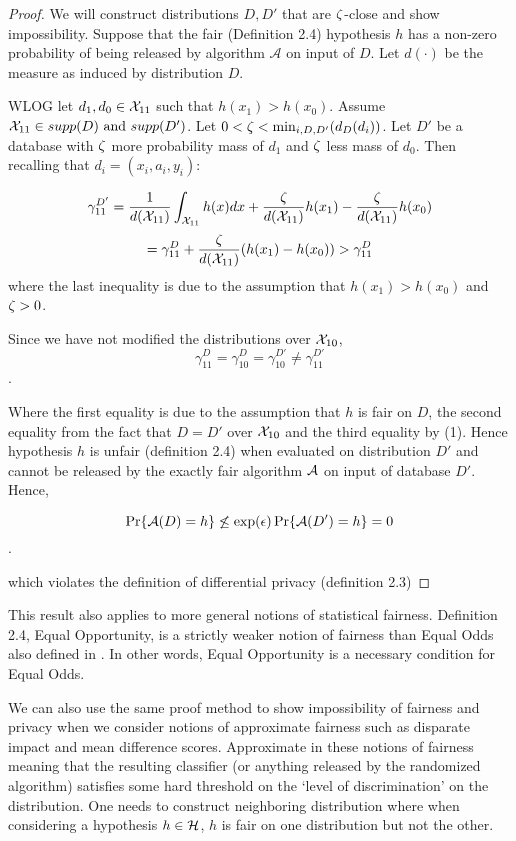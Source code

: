 \begin{proof}
	We will construct distributions $D, D'$ that are $\zeta$-close and show impossibility. Suppose that the fair (Definition 2.4) hypothesis $h$ has a non-zero probability of being released by algorithm $\mathcal{A}$ on input of $D$. Let $d(\cdot)$ be the measure as
  induced by
  distribution $D$.

  WLOG let $d_1, d_0 \in \mathcal{X}_{11}$ such that $h(x_1) >
  h(x_0)$. Assume $\mathcal{X}_{11}\in supp(D) \text{ and } supp(D')$.
  Let $0 < \zeta < \min_{i,D,D'}(d_{D}(d_i))$. Let $D'$ be a database with $\zeta$
  more probability mass of $d_1$ and $\zeta$ less mass of $d_0$. Then
  recalling that $d_i = (x_i, a_i,y_i)$:

$$\gamma_{11}^{D'} = \frac{1}{d(\mathcal{X}_{11})}\int_{\mathcal{X}_{11}}h(x)dx +
\frac{\zeta}{d(\mathcal{X}_{11})} h(x_1) - \frac{\zeta}{d(\mathcal{X}_{11})} h(x_0) $$
\begin{equation}
=\gamma_{11}^{D} + \frac{\zeta}{d(\mathcal{X}_{11})} (h(x_1) -
 h(x_0))>\gamma_{11}^{D}
\end{equation}
where the last inequality is due to the assumption that $h(x_1) >
h(x_0)$ and $\zeta >0$.

Since we have not modified the distributions over $\mathcal{X}_{10}$,
$$\gamma_{11}^D = \gamma_{10}^{D} = \gamma_{10}^{D'} \neq  \gamma_{11}^{D'}$$.

Where the first equality is due to the assumption that $h$ is fair on $D$,
 the second equality from the fact that $D=D'$ over $\mathcal{X}_{10}$ and the third
 equality by (1). Hence hypothesis $h$ is unfair (definition
 2.4) when evaluated on distribution $D'$
 and cannot be released by the exactly fair algorithm $\mathcal{A}$ on input of
 database $D'$. Hence,

$$\Pr\{\mathcal{A}(D) = h\} \not\leq \exp(\epsilon)\Pr\{\mathcal{A}(D') = h\} = 0$$.

which violates the definition of differential privacy (definition 2.3)
\end{proof}

This result also applies to more general notions of statistical fairness. Definition 2.4, Equal Opportunity, is a strictly weaker notion of fairness than Equal Odds also defined in . In other words, Equal Opportunity is a necessary condition for Equal Odds.

We can also use the same proof method to show impossibility of fairness and privacy
when we consider notions of approximate fairness such as disparate impact and mean
difference scores. Approximate in these notions of fairness meaning that the
resulting classifier (or anything released by the randomized algorithm) satisfies some hard threshold on the `level of discrimination' on the distribution.
One needs to construct neighboring distribution where when considering a hypothesis $h\in \mathcal{H}$, $h$ is fair on one distribution but not the other.


